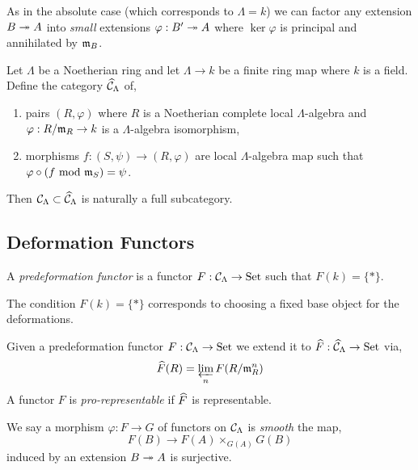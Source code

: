 \documentclass[12pt]{article}
\newcommand{\Set}{\mathrm{Set}}
\begin{document}
\begin{rmk}
As in the absolute case (which corresponds to $\Lambda = k$) we can factor any extension $B \twoheadrightarrow A$ into \textit{small} extensions $\varphi : B' \twoheadrightarrow A$ where $\ker{\varphi}$ is principal and annihilated by $\mathfrak{m}_B$.
\end{rmk}

\begin{defn}
Let $\Lambda$ be a Noetherian ring and let $\Lambda \to k$ be a finite ring map where $k$ is a field. Define the category $\widehat{\mathcal{C}}_\Lambda$ of,
\begin{enumerate}
\item pairs $(R, \varphi)$ where $R$ is a Noetherian complete local $\Lambda$-algebra and $\varphi : R / \mathfrak{m}_R \to k$ is a $\Lambda$-algebra isomorphism,
\item morphisms $f : (S, \psi) \to (R, \varphi)$ are local $\Lambda$-algebra map such that $\varphi \circ (f \text{ mod } \mathfrak{m}_S) = \psi$.
\end{enumerate}
\end{defn}

\begin{rmk}
Then $\mathcal{C}_{\Lambda} \subset \widehat{\mathcal{C}}_{\Lambda}$ is naturally a full subcategory. 
\end{rmk}

\subsection{Deformation Functors}

\begin{defn}
A \textit{predeformation functor} is a functor $F : \C_{\Lambda} \to \Set$ such that $F(k) = \{ * \}$.
\end{defn}

\begin{rmk}
The condition $F(k) = \{ * \}$ corresponds to choosing a fixed base object for the deformations.
\end{rmk}

\begin{defn}
Given a predeformation functor $F : \C_{\Lambda} \to \Set$ we extend it to $\wh{F} : \wh{\C}_{\Lambda} \to \Set$ via,
\[ \widehat{F}(R) = \varprojlim_n F(R/\mathfrak{m}_R^n) \]
A functor $F$ is \textit{pro-representable} if $\widehat{F}$ is representable.
\end{defn}

\begin{defn}
We say a morphism $\varphi : F \to G$ of functors on $\mathcal{C}_\Lambda$ is \textit{smooth} the map,
\[ F(B) \to F(A) \times_{G(A)} G(B) \]
induced by an extension $B \twoheadrightarrow A$ is surjective.
\end{defn}
\end{document}
